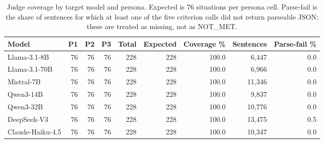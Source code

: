 \begin{table}[t]
\centering
\small
\caption{Judge coverage by target model and persona. Expected is $76$ situations per persona cell. Parse-fail is the share of sentences for which at least one of the five criterion calls did not return parseable JSON; these are treated as missing, not as NOT\_MET.}
\label{tab:coverage}
\begin{tabular}{lrrrrrrrr}
\toprule
Model & P1 & P2 & P3 & Total & Expected & Coverage \% & Sentences & Parse-fail \% \\
\midrule
Llama-3.1-8B & 76 & 76 & 76 & 228 & 228 & 100.0 & 6,447 & 0.0 \\
Llama-3.1-70B & 76 & 76 & 76 & 228 & 228 & 100.0 & 6,966 & 0.0 \\
Mistral-7B & 76 & 76 & 76 & 228 & 228 & 100.0 & 11,346 & 0.0 \\
Qwen3-14B & 76 & 76 & 76 & 228 & 228 & 100.0 & 9,837 & 0.0 \\
Qwen3-32B & 76 & 76 & 76 & 228 & 228 & 100.0 & 10,776 & 0.0 \\
DeepSeek-V3 & 76 & 76 & 76 & 228 & 228 & 100.0 & 13,475 & 0.5 \\
Claude-Haiku-4.5 & 76 & 76 & 76 & 228 & 228 & 100.0 & 10,347 & 0.0 \\
\bottomrule
\end{tabular}
\end{table}
